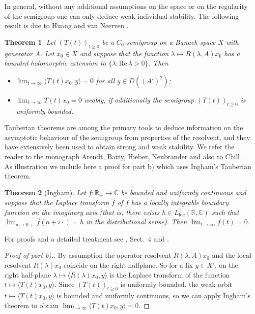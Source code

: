\documentclass[11pt,intlimits, draft,oneside]{amsart}
\newtheorem{thm}{Theorem}[section]
\theoremstyle{definition}
\renewcommand{\Re}{\mathrm{Re}\,}
\def\RR{\mathbb{R}}
\def\CC{\mathbb{C}}
\begin{document}
In general, without any additional assumptions on the space or on
the regularity of the semigroup one can only deduce weak individual
stability. The following result is due to Huang and van Neerven
\cite{huang/vanneerven:1999}.
\begin{thm} \label{thm:weakstab:locres}
Let $(T(t))_{t \geq 0}$ be a $C_0$-semigroup on a Banach space $X$
with generator $A$. Let $x_0 \in X$ and suppose that the function
$\lambda \mapsto R(\lambda,A)x_0$ has a bounded holomorphic
extension to $\{\lambda:\Re \lambda >0\}$. Then
\begin{itemize}
\item[\it a)] $\lim_{t\to \infty} \langle T(t)x_0,y \rangle = 0$ for
all $y \in D((A')^2)$;
\item[\it b)]  $\lim_{t\to\infty} T(t)x_0=0$  weakly, if additionally the semigroup $(T(t))_{t
\geq 0}$ is uniformly bounded.
\end{itemize}
\end{thm}
Tauberian theorems are among the primary tools to deduce information
on the asymptotic behaviour of the semigroup from properties of the
resolvent, and they have extensively been used to obtain strong and
weak stability.
 We refer the reader
to the monograph Arendt, Batty, Hieber, Neubrander
\cite{arendt/etal:2001} and also to Chill \cite{chill:1998}. As
illustration we include here a proof for part b) which uses Ingham's
Tauberian theorem.
\begin{thm}[{Ingham\rm}]
Let $f : \RR_+ \to \CC$ be bounded and uniformly continuous and
suppose that the Laplace transform $\hat{f}$ of $f$ has a locally
integrable boundary function on the imaginary axis (that is, there
exists $h \in L^1_{\mathrm{loc}}(\RR,\CC)$ such that $\lim_{a\to 0+}
\hat{f}(a+i\cdot) = h$ in the distributional sense).
 Then $\lim_{t\to \infty}
f(t) =0$.
\end{thm}
\noindent For proofs and a detailed treatment see
\cite{arendt/etal:2001}, Sect.~4 and \cite{chill:1998}.
\begin{proof}[Proof of part b).]
 By assumption the operator resolvent $R(\lambda, A)x_0$ and the local resolvent $R(\lambda) x_0$ coincide on the right halfplane. So for a fix $y \in
 X'$, on the right half-plane  $\lambda\mapsto \langle R(\lambda)x_0,y\rangle$ is the Laplace transform of
 the function $t\mapsto \langle T(t)x_0,y\rangle$.
 Since $(T(t))_{t \geq 0}$
is uniformly bounded, the weak orbit $t \mapsto \langle T(t)x_0,y
\rangle$ is bounded and uniformly continuous, so we can apply
Ingham's theorem to obtain $\lim_{t\to\infty} \langle T(t)x_0,y
\rangle = 0$.
\end{proof}
\end{document}
